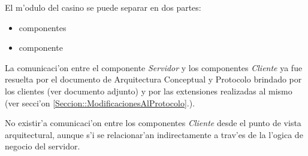 El m'odulo del casino se puede separar en dos partes: 

\begin{itemize}
\item componentes 
\item componente 
\end{itemize}  

La comunicaci'on entre el componente {\it Servidor} y los componentes {\it Cliente} ya fue resuelta por el documento de Arquitectura Conceptual y Protocolo brindado por los clientes (ver documento adjunto) y por las extensiones realizadas al mismo (ver secci'on \ref{Seccion::ModificacionesAlProtocolo}.).

No existir'a comunicaci'on entre los componentes {\it Cliente} desde el punto de vista arquitectural, aunque s'i se relacionar'an indirectamente a trav'es de la l'ogica de negocio del servidor.
